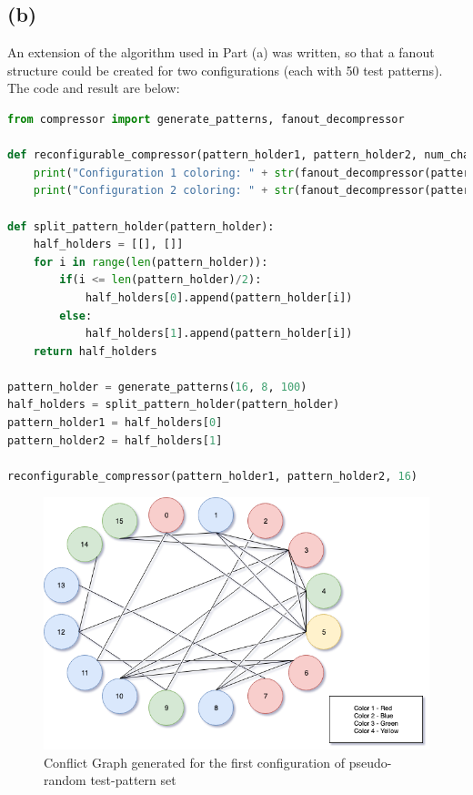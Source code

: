 \documentclass[letterpaper]{article} %
\begin{document}
\subsection*{(b)}
\hspace{0.5cm}An extension of the algorithm used in Part (a) was written, so that a fanout structure could be created for two configurations (each with 50 test patterns). The code and result are below:
\begin{lstlisting}[language=Python, caption=Python code used to generate test-patterns; produce the conflict graph; and color the graph in two configurations]
	from compressor import generate_patterns, fanout_decompressor

def reconfigurable_compressor(pattern_holder1, pattern_holder2, num_chains):
    print("Configuration 1 coloring: " + str(fanout_decompressor(pattern_holder1, num_chains)))
    print("Configuration 2 coloring: " + str(fanout_decompressor(pattern_holder2, num_chains)))

def split_pattern_holder(pattern_holder):
    half_holders = [[], []]
    for i in range(len(pattern_holder)):
        if(i <= len(pattern_holder)/2):
            half_holders[0].append(pattern_holder[i])
        else:
            half_holders[1].append(pattern_holder[i])
    return half_holders

pattern_holder = generate_patterns(16, 8, 100)
half_holders = split_pattern_holder(pattern_holder)
pattern_holder1 = half_holders[0]
pattern_holder2 = half_holders[1]

reconfigurable_compressor(pattern_holder1, pattern_holder2, 16)
\end{lstlisting}

\newpage

\begin{figure}[ht]
	\centering
	\includegraphics[width=12.0cm]{conf1.png}
	\caption{Conflict Graph generated for the first configuration of pseudo-random test-pattern set}
\end{figure}
\end{document}

